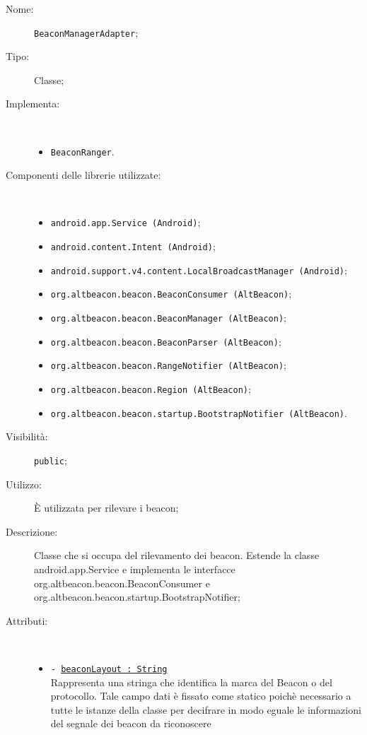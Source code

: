 \documentclass[../DefinizioneDiProdotto.tex]{subfiles}
\begin{document}
\begin{description}
	\item[Nome:] \texttt{BeaconManagerAdapter};
	\item[Tipo:] Classe;
	\item[Implementa:] \
	\begin{itemize}
		\item \texttt{BeaconRanger}.
		
	\end{itemize}
	\item[Componenti delle librerie utilizzate:] \
	\begin{itemize}
		\item \texttt{android.app.Service (Android)};
		
		\item \texttt{android.content.Intent (Android)};
		
		\item \texttt{android.support.v4.content.LocalBroadcastManager (Android)};
		
		\item \texttt{org.altbeacon.beacon.BeaconConsumer (AltBeacon)};
		
		\item \texttt{org.altbeacon.beacon.BeaconManager (AltBeacon)};
		
		\item \texttt{org.altbeacon.beacon.BeaconParser (AltBeacon)};
		
		\item \texttt{org.altbeacon.beacon.RangeNotifier (AltBeacon)};
		
		\item \texttt{org.altbeacon.beacon.Region (AltBeacon)};
		
		\item \texttt{org.altbeacon.beacon.startup.BootstrapNotifier (AltBeacon)}.
		
	\end{itemize}
	\item[Visibilità:] \texttt{public};
	\item[Utilizzo:] È utilizzata per rilevare i beacon;
	\item[Descrizione:] Classe che si occupa del rilevamento dei beacon. Estende la classe android.app.Service e implementa le interfacce org.altbeacon.beacon.BeaconConsumer e org.altbeacon.beacon.startup.BootstrapNotifier;
	\item[Attributi:] \
	\begin{itemize}
		\item \texttt{- \underline{beaconLayout : String}}\\
		Rappresenta una stringa che identifica la marca del Beacon o del protocollo. Tale campo dati è fissato come statico poichè necessario a tutte le istanze della classe per decifrare in modo eguale le informazioni del segnale dei beacon da riconoscere
		

\end{itemize}
\end{description}
\end{document}
